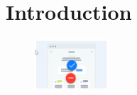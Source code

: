 \documentclass[oneside]{book}
\begin{document}
\chapter{Introduction}
\blindtext

\begin{figure}
	\centering
		\includegraphics[width=0.25\textwidth]{wireframe.png}
\end{figure}
\blindtext[2]
\end{document}

